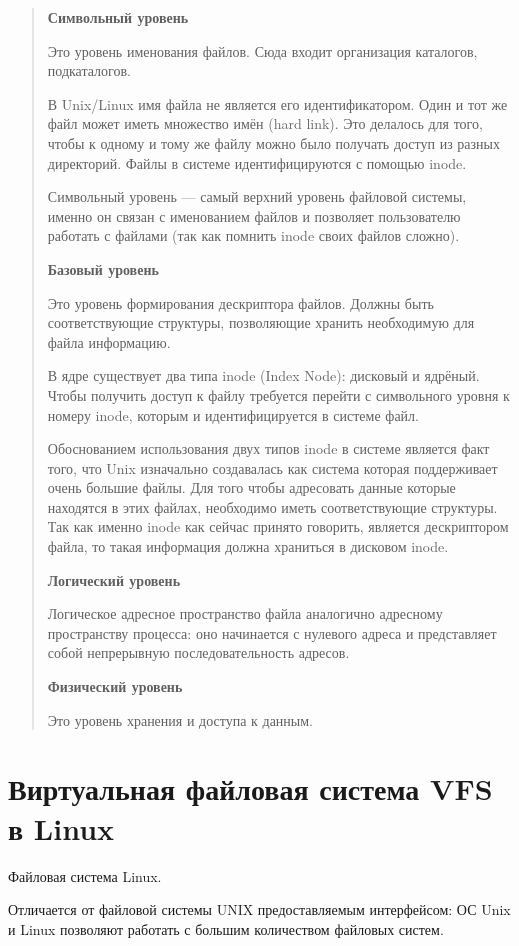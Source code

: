 \begin{quote}
\textbf{Символьный уровень}

Это уровень именования файлов. Сюда входит организация каталогов, подкаталогов.

В Unix/Linux имя файла не является его идентификатором. Один и тот же файл может иметь множество имён (hard link). Это делалось для того, чтобы к одному и тому же файлу можно было получать доступ из разных директорий. Файлы в системе идентифицируются с помощью inode.

Символьный уровень — самый верхний уровень файловой системы, именно он связан с именованием файлов и позволяет пользователю работать с файлами (так как помнить inode своих файлов сложно).

\textbf{Базовый уровень}


Это уровень формирования дескриптора файлов. Должны быть соответствующие структуры, позволяющие хранить необходимую для файла информацию.

В ядре существует два типа inode (Index Node): дисковый и ядрёный. Чтобы получить доступ к файлу требуется перейти с символьного уровня к номеру inode, которым и идентифицируется в системе файл.

Обоснованием использования двух типов inode в системе является факт того, что Unix изначально создавалась как система которая поддерживает очень большие файлы. Для того чтобы адресовать данные которые находятся в этих файлах, необходимо иметь соответствующие структуры. Так как именно inode как сейчас принято говорить, является дескриптором файла, то такая информация должна храниться в дисковом inode.

\textbf{Логический уровень}

Логическое адресное пространство файла аналогично адресному пространству процесса: оно начинается с нулевого адреса и представляет собой непрерывную последовательность адресов.

\textbf{Физический уровень}

Это уровень хранения и доступа к данным.

\end{quote}

\section{Виртуальная файловая система VFS в Linux}

Файловая система Linux.

Отличается от файловой системы UNIX предоставляемым интерфейсом: ОС Unix и Linux позволяют работать с большим количеством файловых систем.


